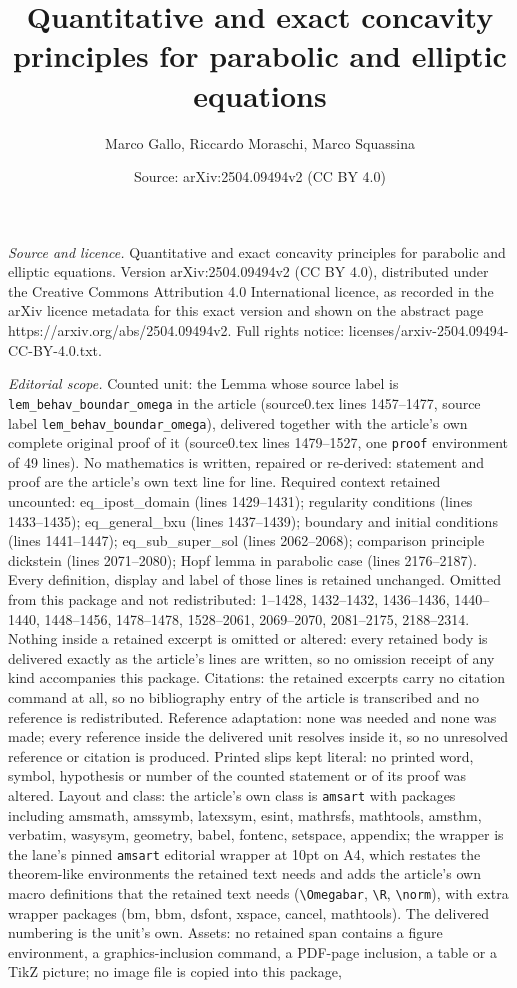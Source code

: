 \documentclass[10pt,a4paper]{amsart}
\title[Quantitative and exact concavity principles for parabolic an]{Quantitative and exact concavity principles for parabolic and elliptic equations}
\author{Marco Gallo, Riccardo Moraschi, Marco Squassina}
\date{Source: arXiv:2504.09494v2 (CC BY 4.0)}
\begin{document}
\maketitle

\noindent\emph{Source and licence.} Quantitative and exact concavity principles for parabolic and elliptic equations. Version arXiv:2504.09494v2 (CC BY 4.0), distributed under the Creative Commons Attribution 4.0 International licence, as recorded in the arXiv licence metadata for this exact version and shown on the abstract page https://arxiv.org/abs/2504.09494v2. Full rights notice: licenses/arxiv-2504.09494-CC-BY-4.0.txt.\par\smallskip

\noindent\textit{Editorial scope.} Counted unit: the Lemma whose source label is \texttt{lem\_behav\_boundar\_omega} in the article (source0.tex lines 1457--1477, source label \texttt{lem\_behav\_boundar\_omega}), delivered together with the article's own complete original proof of it (source0.tex lines 1479--1527, one \texttt{proof} environment of 49 lines). No mathematics is written, repaired or re-derived: statement and proof are the article's own text line for line. Required context retained uncounted: eq\_ipost\_domain (lines 1429--1431); regularity conditions (lines 1433--1435); eq\_general\_bxu (lines 1437--1439); boundary and initial conditions (lines 1441--1447); eq\_sub\_super\_sol (lines 2062--2068); comparison principle dickstein (lines 2071--2080); Hopf lemma in parabolic case (lines 2176--2187). Every definition, display and label of those lines is retained unchanged. Omitted from this package and not redistributed: 1--1428, 1432--1432, 1436--1436, 1440--1440, 1448--1456, 1478--1478, 1528--2061, 2069--2070, 2081--2175, 2188--2314. Nothing inside a retained excerpt is omitted or altered: every retained body is delivered exactly as the article's lines are written, so no omission receipt of any kind accompanies this package. Citations: the retained excerpts carry no citation command at all, so no bibliography entry of the article is transcribed and no reference is redistributed. Reference adaptation: none was needed and none was made; every reference inside the delivered unit resolves inside it, so no unresolved reference or citation is produced. Printed slips kept literal: no printed word, symbol, hypothesis or number of the counted statement or of its proof was altered. Layout and class: the article's own class is \texttt{amsart} with packages including amsmath, amssymb, latexsym, esint, mathrsfs, mathtools, amsthm, verbatim, wasysym, geometry, babel, fontenc, setspace, appendix; the wrapper is the lane's pinned \texttt{amsart} editorial wrapper at 10pt on A4, which restates the theorem-like environments the retained text needs and adds the article's own macro definitions that the retained text needs (\texttt{\textbackslash Omegabar}, \texttt{\textbackslash R}, \texttt{\textbackslash norm}), with extra wrapper packages (bm, bbm, dsfont, xspace, cancel, mathtools). The delivered numbering is the unit's own. Assets: no retained span contains a figure environment, a graphics-inclusion command, a PDF-page inclusion, a table or a TikZ picture; no image file is copied into this package, 
\end{document}
